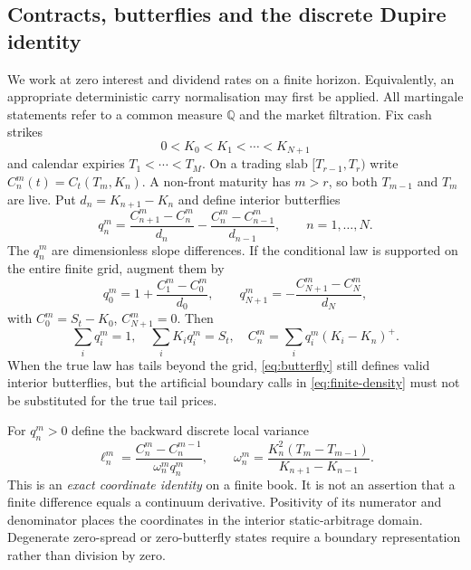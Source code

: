 \documentclass[11pt,a4paper]{article}
\numberwithin{equation}{section}
\theoremstyle{definition}\newtheorem{definition}[theorem]{Definition}
\theoremstyle{remark}\newtheorem{remark}[theorem]{Remark}
\newcommand{\Q}{\mathbb Q}\newcommand{\Pp}{\mathbb P}
\begin{document}
\subsection{Contracts, butterflies and the discrete Dupire identity}
We work at zero interest and dividend rates on a finite horizon. Equivalently, an appropriate deterministic carry normalisation may first be applied. All martingale statements refer to a common measure $\Q$ and the market filtration. Fix cash strikes
\[
 0<K_0<K_1<\cdots<K_{N+1}
\]
and calendar expiries $T_1<\cdots<T_M$. On a trading slab $[T_{r-1},T_r)$ write $C_n^m(t)=C_t(T_m,K_n)$. A non-front maturity has $m>r$, so both $T_{m-1}$ and $T_m$ are live. Put $d_n=K_{n+1}-K_n$ and define interior butterflies
\begin{equation}
 q_n^m=\frac{C_{n+1}^m-C_n^m}{d_n}
       -\frac{C_n^m-C_{n-1}^m}{d_{n-1}},\qquad n=1,\ldots,N.
 \label{eq:butterfly}
\end{equation}
The $q_n^m$ are dimensionless slope differences. If the conditional law is supported on the entire finite grid, augment them by
\[
 q_0^m=1+\frac{C_1^m-C_0^m}{d_0},\qquad
 q_{N+1}^m=-\frac{C_{N+1}^m-C_N^m}{d_N},
\]
with $C_0^m=S_t-K_0$, $C_{N+1}^m=0$. Then
\begin{equation}
 \sum_iq_i^m=1,\quad \sum_iK_iq_i^m=S_t,\quad
 C_n^m=\sum_iq_i^m(K_i-K_n)^+.
 \label{eq:finite-density}
\end{equation}
When the true law has tails beyond the grid, \eqref{eq:butterfly} still defines valid interior butterflies, but the artificial boundary calls in \eqref{eq:finite-density} must not be substituted for the true tail prices.

For $q_n^m>0$ define the backward discrete local variance
\begin{equation}
 \ell_n^m=\frac{C_n^m-C_n^{m-1}}{\omega_n^m q_n^m},
 \qquad
 \omega_n^m=\frac{K_n^2(T_m-T_{m-1})}{K_{n+1}-K_{n-1}}.
 \label{eq:dupire-discrete}
\end{equation}
This is an \emph{exact coordinate identity} on a finite book. It is not an assertion that a finite difference equals a continuum derivative. Positivity of its numerator and denominator places the coordinates in the interior static-arbitrage domain. Degenerate zero-spread or zero-butterfly states require a boundary representation rather than division by zero.
\end{document}
